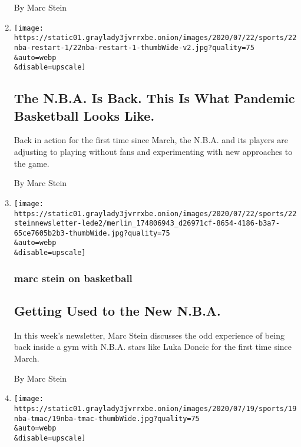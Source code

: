 \begin{enumerate}
  By Marc Stein
\item
  \href{/2020/07/22/sports/basketball/nba-restart-disney-world.html}{}

  \texttt{[image: https://static01.graylady3jvrrxbe.onion/images/2020/07/22/sports/22nba-restart-1/22nba-restart-1-thumbWide-v2.jpg?quality=75\\\&auto=webp\\\&disable=upscale]}

  \hypertarget{the-nba-is-back-this-is-what-pandemic-basketball-looks-like}{%
  \subsection{The N.B.A. Is Back. This Is What Pandemic Basketball Looks
  Like.}\label{the-nba-is-back-this-is-what-pandemic-basketball-looks-like}}

  Back in action for the first time since March, the N.B.A. and its
  players are adjusting to playing without fans and experimenting with
  new approaches to the game.

  By Marc Stein
\item
  \href{/2020/07/22/sports/basketball/nba-bubble-practice.html}{}

  \texttt{[image: https://static01.graylady3jvrrxbe.onion/images/2020/07/22/sports/22steinnewsletter-lede2/merlin\_174806943\_d26971cf-8654-4186-b3a7-65ce7605b2b3-thumbWide.jpg?quality=75\\\&auto=webp\\\&disable=upscale]}

  \hypertarget{marc-stein-on-basketball-1}{%
  \subsubsection{marc stein on
  basketball}\label{marc-stein-on-basketball-1}}

  \hypertarget{getting-used-to-the-new-nba}{%
  \subsection{Getting Used to the New
  N.B.A.}\label{getting-used-to-the-new-nba}}

  In this week's newsletter, Marc Stein discusses the odd experience of
  being back inside a gym with N.B.A. stars like Luka Doncic for the
  first time since March.

  By Marc Stein
\item
  \href{/2020/07/19/sports/basketball/tracy-mcgrady-jermaine-oneal-sports-agency.html}{}

  \texttt{[image: https://static01.graylady3jvrrxbe.onion/images/2020/07/19/sports/19nba-tmac/19nba-tmac-thumbWide.jpg?quality=75\\\&auto=webp\\\&disable=upscale]}


\end{enumerate}
